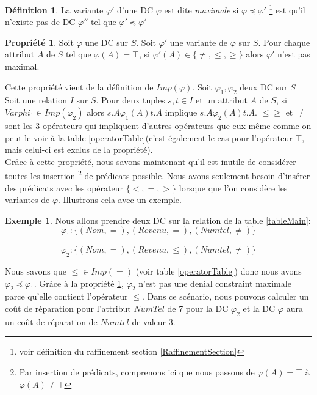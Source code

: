 \documentclass[letterpaper, 12pt]{report}
\theoremstyle{definition}
\newtheorem{mydef}{Définition}
\newtheorem{myprop}{Propriété}
\newtheorem{myexample}{Exemple}
\begin{document}
\begin{mydef}
 La variante $\varphi'$ d'une DC $\varphi$ est dite \emph{maximale} si  $\varphi \preceq \varphi'$ \footnote{voir définition du raffinement section \ref{RaffinementSection}} est qu'il n'existe pas de DC $\varphi''$ tel que $\varphi' \preceq \varphi'$
\end{mydef}

\begin{myprop}\cite{main}
\label{maxprop}
Soit $\varphi$ une DC sur $S$. Soit $\varphi'$ une variante de $\varphi$ sur $S$. Pour chaque attribut $A$ de $S$ tel que $\varphi(A) = \top$, si $\varphi'(A) \in \{\neq,\leq,\geq \}$ alors $\varphi'$ n'est pas maximal.

\end{myprop}

Cette propriété vient de la définition de $Imp(\varphi)$. Soit $\varphi_1, \varphi_2$ deux DC sur $S$ Soit une relation $I$ sur $S$. Pour deux tuples $s,t \in I$ et un attribut $A$ de $S$, si $Varphi_1 \in Imp(\varphi_2)$ alors $s.A \varphi_1(A) t.A$ implique $s.A \varphi_2(A) t.A$. $\leq \geq$ et $\neq$ sont les 3 opérateurs qui impliquent d'autres opérateurs que eux même comme on peut le voir à la table \ref{operatorTable}(c'est également le cas pour l'opérateur $\top$, mais celui-ci est exclus de la propriété).\\

Grâce à cette propriété, nous savons maintenant qu'il est inutile de considérer toutes les insertion \footnote{Par insertion de prédicats, comprenons ici que nous passons de $\varphi(A) = \top$ à $\varphi(A) \neq \top$} de prédicats possible. Nous avons seulement besoin d'insérer des prédicats avec les opérateur $\{<,=,>\}$ lorsque que l'on considère les variantes de $\varphi$. Illustrons cela avec un exemple. 
\begin{myexample}
Nous allons prendre deux DC sur la relation de la table \ref{tableMain}:
$$ \varphi_1 : \{(Nom,=),(Revenu,=),(Numtel,\neq) \}$$

$$ \varphi_2 : \{(Nom,=),(Revenu,\leq),(Numtel,\neq) \}$$

\end{myexample}

Nous savons que $\leq \in Imp(=)$ (voir table \ref{operatorTable}) donc nous avons $\varphi_2 \preceq \varphi_1$. Grâce à la propriété \ref{maxprop}, $\varphi_2$ n'est pas une denial constraint maximale parce qu'elle contient l'opérateur $\leq$. Dans ce scénario, nous pouvons calculer un coût de réparation pour l'attribut $NumTel$ de 7 pour la DC $\varphi_2$ et la DC $\varphi$ aura un coût de réparation de $Numtel$ de valeur 3.
\end{document}
